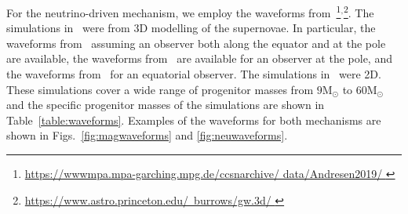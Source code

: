 \documentclass[aps,twocolumn,showpacs,groupedaddress, nofootinbib]{revtex4}  %
\begin{document}
%
%
For the neutrino-driven mechanism, we employ the waveforms
from~\cite{10.1093mnrasstz990, kuroda2017correlated, muller2012parametrized,
powell2019gravitational, radice2019characterizing, yakunin2015gravitational,
yakunin2017gravitational, ott2009gravitational, murphy2009model,
ott2013general}\footnote{\href{https://wwwmpa.mpa-garching.mpg.de/ccsnarchive/data/Andresen2019/}
{https://wwwmpa.mpa-garching.mpg.de/ccsnarchive/
data/Andresen2019/ }}$^{,}$\footnote{\href{ https://www.astro.princeton.edu/~burrows/gw.3d/  }
{ https://www.astro.princeton.edu/~burrows/gw.3d/  }}. The simulations in~\cite{10.1093mnrasstz990,
kuroda2017correlated, muller2012parametrized, powell2019gravitational,
radice2019characterizing, yakunin2017gravitational, ott2013general} were from 3D modelling of
the supernovae. 
In particular, the waveforms from~\cite{10.1093mnrasstz990, muller2012parametrized,  ott2013general} assuming an observer both along the equator and at the pole
are available, 
the waveforms from~\cite{kuroda2017correlated, powell2019gravitational} are available for an observer at the pole, and the waveforms from~\cite{yakunin2017gravitational,
radice2019characterizing} for an equatorial observer.
The simulations in~\cite{yakunin2015gravitational,
ott2009gravitational, murphy2009model} were 2D.   These
simulations cover a wide range of progenitor masses from $9\text{M}_\odot$ to
$60\text{M}_\odot$ and the specific progenitor masses of the simulations are
shown in Table~\ref{table:waveforms}. Examples of the waveforms for
both mechanisms are shown in Figs.~\ref{fig:magwaveforms} and
\ref{fig:neuwaveforms}.
\end{document}
